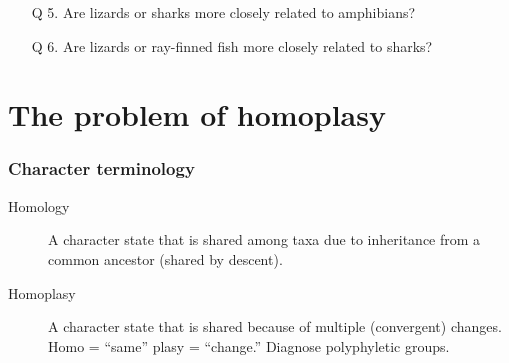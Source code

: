 \begin{frame}
    \begin{enumerate}%
        \vspace{-1cm}
        \begin{columns}
            \small

            Sharks and rays

            \vspace{0.3cm}
            Lizards

            \vspace{0.3cm}
            Snakes

            \vspace{0.3cm}
            Mammals

            \vspace{0.3cm}
            Amphibians

            \vspace{0.3cm}
            Ray-finned fish
        \end{columns}

            \vspace{0.5cm}
        \item[Q 5.] Are lizards or sharks more closely related to amphibians?

            \vspace{0.5cm}
        \item[Q 6.] Are lizards or ray-finned fish more closely related to sharks?
        
    \end{enumerate}
\end{frame}

\section{The problem of homoplasy}

\begin{frame}
    \frametitle{Character terminology}
    \begin{description}
        \item[Homology] A character state that is shared among taxa due to
            inheritance from a common ancestor (shared by descent).
        \item[Homoplasy] A character state that is shared because of multiple
            (convergent) changes. Homo = ``same'' plasy = ``change.'' Diagnose
            polyphyletic groups.
    \end{description}
\end{frame}

